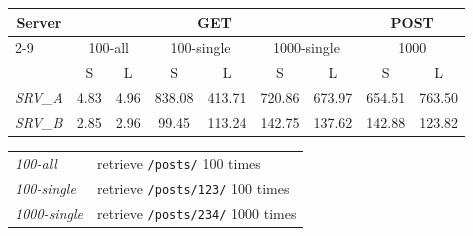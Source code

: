 \begin{table*}
    \centering
    \begin{tabular}{l*{8}c}
        \toprule
        \multicolumn{1}{c}{\textbf{Server}} & \multicolumn{6}{c}{\textbf{GET}} & \multicolumn{2}{c}{\textbf{POST}} \\
        \cmidrule{2-9} %
        & \multicolumn{2}{c}{100-all} & \multicolumn{2}{c}{100-single} & \multicolumn{2}{c}{1000-single} & \multicolumn{2}{c}{1000} \\
        & S & L & S & L & S & L & S & L \\
        \midrule
        \emph{SRV\_A} & 4.83 & 4.96 & 838.08 & 413.71 & 720.86 & 673.97 & 654.51 & 763.50 \\
        \emph{SRV\_B} & 2.85 & 2.96 & 99.45 & 113.24 & 142.75 & 137.62 & 142.88 & 123.82 \\
        \bottomrule
    \end{tabular}
    \caption{A table (of requests/second)}
    \caption*{\textbf{GET} Legend}
        \begin{tabular}{*{2}l}
            \toprule
            \emph{100-all} & retrieve \texttt{/posts/} 100 times \\
            \emph{100-single} & retrieve \texttt{/posts/123/} 100 times \\
            \emph{1000-single} & retrieve \texttt{/posts/234/} 1000 times \\
            \bottomrule
        \end{tabular}
    \label{tab:eval}
\end{table*}
